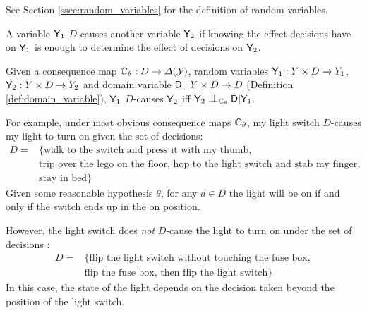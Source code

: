 See Section \ref{ssec:random_variables} for the definition of random variables.


A variable $\mathsf{Y}_1$ $D$-causes another variable $\mathsf{Y}_2$ if knowing the effect decisions have on $\mathsf{Y}_1$ is enough to determine the effect of decisions on $\mathsf{Y}_2$. 

\begin{definition}[$D$-causation]
Given a consequence map $\mathbb{C}_\theta:D\to \Delta(\mathcal{Y})$, random variables $\mathsf{Y}_1:Y\times D\to Y_1$, $\mathsf{Y}_2:Y\times D\to Y_2$ and domain variable $\mathsf{D}:Y\times D\to D$ (Definition \ref{def:domain_variable}), $\mathsf{Y}_1$ $D$-causes $\mathsf{Y}_2$ iff $\RV{Y}_2\CI_{\kernel{C}_\theta} \RV{D}|\RV{Y}_1$.
\end{definition}

For example, under most obvious consequence maps $\mathbb{C}_\theta$, my light switch $D$-causes my light to turn on given the set of decisions:
\begin{align*}
D=&\{\text{walk to the switch and press it with my thumb}, \\
    &\text{trip over the lego on the floor, hop to the light switch and stab my finger at it},\\
    &\text{stay in bed}\}
\end{align*}
Given some reasonable hypothesis $\theta$, for any $d\in D$ the light will be on if and only if the switch ends up in the on position. 

However, the light switch does \emph{not} $D$-cause the light to turn on under the set of decisions :
\begin{align*}
 D=&\{\text{flip the light switch without touching the fuse box},\\
 &\text{flip the fuse box, then flip the light switch}\}
\end{align*}
In this case, the state of the light depends on the decision taken beyond the position of the light switch.

